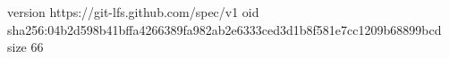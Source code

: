 version https://git-lfs.github.com/spec/v1
oid sha256:04b2d598b41bffa4266389fa982ab2e6333ced3d1b8f581e7cc1209b68899bcd
size 66
